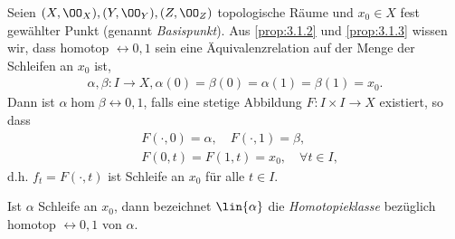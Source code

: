 Seien $(X,\OO_X), (Y,\OO_Y), (Z,\OO_Z)$ topologische Räume und $x_0\in X$ fest
gewählter Punkt (genannt \emph{Basispunkt}). Aus \ref{prop:3.1.2} und
\ref{prop:3.1.3} wissen wir, dass homotop $\rel{0,1}$ sein eine
Äquivalenzrelation auf der Menge der Schleifen an $x_0$ ist,
\begin{align*}
\alpha,\beta: I\to X, \alpha(0) = \beta(0) = \alpha(1) = \beta(1) = x_0.
\end{align*}
Dann ist $\alpha\hom\beta\rel{0,1}$, falls eine stetige Abbildung $F: I\times
I\to X$ existiert, so dass
\begin{align*}
&F(\cdot,0) = \alpha,\quad F(\cdot,1) = \beta,\\
&F(0,t) = F(1,t) = x_0,\quad \forall t\in I,
\end{align*}
d.h. $f_t = F(\cdot,t)$ ist Schleife an $x_0$ für alle $t\in I$.

\begin{defnn}[Bezeichnung]
Ist $\alpha$ Schleife an $x_0$, dann bezeichnet $\lin{\alpha}$ die
\emph{Homotopieklasse} bezüglich homotop $\rel{0,1}$ von
$\alpha$.\fishhere
\end{defnn}

